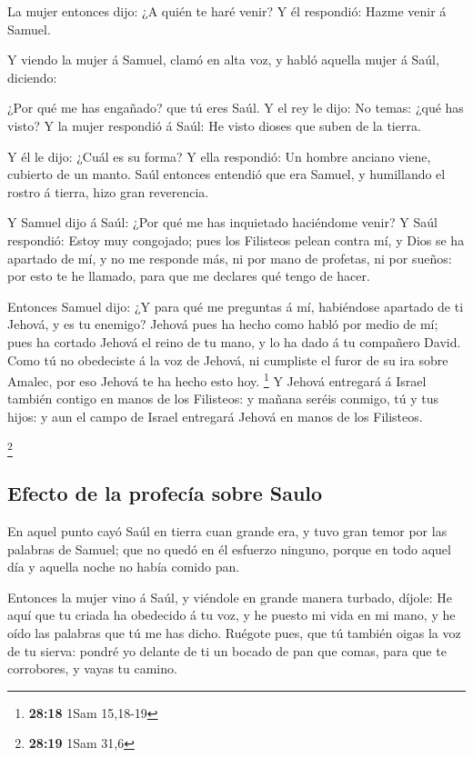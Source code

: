  La mujer entonces dijo: ¿A quién te haré venir? Y él
respondió: Hazme venir á Samuel.

 Y viendo la mujer á Samuel, clamó en alta voz, y habló
aquella mujer á Saúl, diciendo:

 ¿Por qué me has engañado? que tú eres Saúl. Y el rey le
dijo: No temas: ¿qué has visto? Y la mujer respondió á Saúl: He visto
dioses que suben de la tierra.

 Y él le dijo: ¿Cuál es su forma? Y ella respondió: Un
hombre anciano viene, cubierto de un manto. Saúl entonces entendió que
era Samuel, y humillando el rostro á tierra, hizo gran reverencia.

 Y Samuel dijo á Saúl: ¿Por qué me has inquietado
haciéndome venir? Y Saúl respondió: Estoy muy congojado; pues los
Filisteos pelean contra mí, y Dios se ha apartado de mí, y no me
responde más, ni por mano de profetas, ni por sueños: por esto te he
llamado, para que me declares qué tengo de hacer.

 Entonces Samuel dijo: ¿Y para qué me preguntas á mí,
habiéndose apartado de ti Jehová, y es tu enemigo?  Jehová
pues ha hecho como habló por medio de mí; pues ha cortado Jehová el
reino de tu mano, y lo ha dado á tu compañero David.  Como
tú no obedeciste á la voz de Jehová, ni cumpliste el furor de su ira
sobre Amalec, por eso Jehová te ha hecho esto hoy. \footnote{\textbf{28:18}
  1Sam 15,18-19}  Y Jehová entregará á Israel también
contigo en manos de los Filisteos: y mañana seréis conmigo, tú y tus
hijos: y aun el campo de Israel entregará Jehová en manos de los
Filisteos.

\footnote{\textbf{28:19} 1Sam 31,6}

\hypertarget{efecto-de-la-profecuxeda-sobre-saulo}{%
\subsection{Efecto de la profecía sobre
Saulo}\label{efecto-de-la-profecuxeda-sobre-saulo}}

 En aquel punto cayó Saúl en tierra cuan grande era, y tuvo
gran temor por las palabras de Samuel; que no quedó en él esfuerzo
ninguno, porque en todo aquel día y aquella noche no había comido pan.

 Entonces la mujer vino á Saúl, y viéndole en grande manera
turbado, díjole: He aquí que tu criada ha obedecido á tu voz, y he
puesto mi vida en mi mano, y he oído las palabras que tú me has dicho.
 Ruégote pues, que tú también oigas la voz de tu sierva:
pondré yo delante de ti un bocado de pan que comas, para que te
corrobores, y vayas tu camino.

